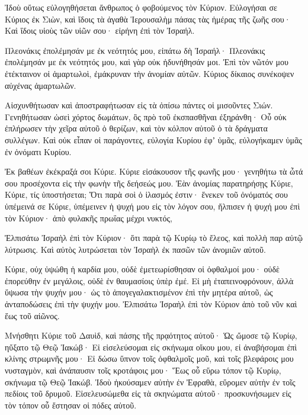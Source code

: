 \begin{spacing}{1.1}
\begin{multicols}{2}
Ἰδοὺ οὕτως εὐλογηθήσεται ἄνθρωπος ὁ φοβούμενος τὸν Κύριον.
Εὐλογήσαι σε Κύριος ἐκ Σιὼν, καὶ ἴδοις τὰ ἀγαθὰ Ἱερουσαλὴμ πάσας τὰς ἡμέρας τῆς ζωῆς σου·
Καὶ ἴδοις υἱοὺς τῶν υἱῶν σου· εἰρήνη ἐπὶ τὸν Ἰσραήλ.

Πλεονάκις ἐπολέμησάν με ἐκ νεότητός μου, εἰπάτω δὴ Ἰσραήλ·
Πλεονάκις ἐπολέμησάν με ἐκ νεότητός μου, καὶ γὰρ οὐκ ἠδυνήθησάν μοι.
Ἐπὶ τὸν νῶτόν μου ἐτέκταινον οἱ ἁμαρτωλοὶ, ἐμάκρυναν τὴν ἀνομίαν αὐτῶν.
Κύριος δίκαιος συνέκοψεν αὐχένας ἁμαρτωλῶν.

Αἰσχυνθήτωσαν καὶ ἀποστραφήτωσαν εἰς τὰ ὀπίσω πάντες οἱ μισοῦντες Σιών.
Γενηθήτωσαν ὡσεὶ χόρτος δωμάτων, ὃς πρὸ τοῦ ἐκσπασθῆναι ἐξηράνθη·
Οὗ οὐκ ἐπλήρωσεν τὴν χεῖρα αὐτοῦ ὁ θερίζων, καὶ τὸν κόλπον αὐτοῦ ὁ τὰ δράγματα συλλέγων.
Καὶ οὐκ εἶπαν οἱ παράγοντες, εὐλογία Κυρίου ἐφʼ ὑμᾶς, εὐλογήκαμεν ὑμᾶς ἐν ὀνόματι Κυρίου.

Ἐκ βαθέων ἐκέκραξά σοι Κύριε.
Κύριε εἰσάκουσον τῆς φωνῆς μου· γενηθήτω τὰ ὦτά σου προσέχοντα εἰς τὴν φωνὴν τῆς δεήσεώς μου.
Ἐὰν ἀνομίας παρατηρήσῃς Κύριε, Κύριε, τίς ὑποστήσεται;
Ὅτι παρὰ σοὶ ὁ ἱλασμός ἐστιν· ἕνεκεν τοῦ ὀνόματός σου
ὑπέμεινά σε Κύριε, ὑπέμεινεν ἡ ψυχή μου εἰς τὸν λόγον σου,
ἤλπισεν ἡ ψυχή μου ἐπὶ τὸν Κύριον· ἀπὸ φυλακῆς πρωΐας μέχρι νυκτός,

Ἐλπισάτω Ἰσραὴλ ἐπὶ τὸν Κύριον· ὅτι παρὰ τῷ Κυρίῳ τὸ ἔλεος, καὶ πολλὴ παρ αὐτῷ λύτρωσις.
Καὶ αὐτὸς λυτρώσεται τὸν Ἰσραὴλ ἐκ πασῶν τῶν ἀνομιῶν αὐτοῦ.

Κύριε, οὐχ ὑψώθη ἡ καρδία μου, οὐδὲ ἐμετεωρίσθησαν οἱ ὀφθαλμοί μου· οὐδὲ ἐπορεύθην ἐν μεγάλοις, οὐδὲ ἐν θαυμασίοις ὑπὲρ ἐμέ.
Εἰ μὴ ἐταπεινοφρόνουν, ἀλλὰ ὕψωσα τὴν ψυχήν μου· ὡς τὸ ἀπογεγαλακτισμένον ἐπὶ τὴν μητέρα αὐτοῦ, ὡς ἀνταποδώσεις ἐπὶ τὴν ψυχήν μου.
Ἐλπισάτω Ἰσραὴλ ἐπὶ τὸν Κύριον ἀπὸ τοῦ νῦν καὶ ἕως τοῦ αἰῶνος.

Μνήσθητι Κύριε τοῦ Δαυὶδ, καὶ πάσης τῆς πρᾳότητος αὐτοῦ·
Ὡς ὤμοσε τῷ Κυρίῳ, ηὔξατο τῷ Θεῷ Ἰακώβ·
Εἰ εἰσελεύσομαι εἰς σκήνωμα οἴκου μου, εἰ ἀναβήσομαι ἐπὶ κλίνης στρωμνῆς μου·
Εἰ δώσω ὕπνον τοῖς ὀφθαλμοῖς μοῦ, καὶ τοῖς βλεφάροις μου νυσταγμὸν, καὶ ἀνάπαυσιν τοῖς κροτάφοις μου·
Ἕως οὗ εὕρω τόπον τῷ Κυρίῳ, σκήνωμα τῷ Θεῷ Ἰακώβ.
Ἰδοὺ ἠκούσαμεν αὐτὴν ἐν Ἐφραθὰ, εὕρομεν αὐτὴν ἐν τοῖς πεδίοις τοῦ δρυμοῦ.
Εἰσελευσώμεθα εἰς τὰ σκηνώματα αὐτοῦ· προσκυνήσωμεν εἰς τὸν τόπον οὗ ἔστησαν οἱ πόδες αὐτοῦ.


\end{multicols}
\end{spacing}
